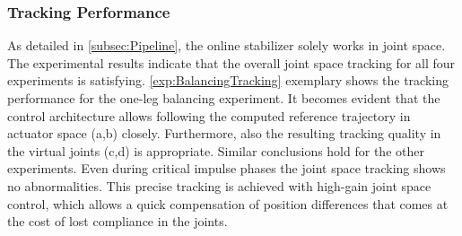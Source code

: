 \subsubsection{Tracking Performance}
As detailed in \cref{subsec:Pipeline}, the online stabilizer solely works in joint space. The experimental results indicate that the overall joint space tracking for all four experiments is satisfying. 
\cref{exp:BalancingTracking} exemplary shows the tracking performance for the one-leg balancing experiment. It becomes evident that the control architecture allows following the computed reference trajectory in actuator space (a,b) closely. Furthermore, also the resulting tracking quality in the virtual joints (c,d) is appropriate. Similar conclusions hold for the other experiments. Even during critical impulse phases the joint space tracking shows no abnormalities. This precise tracking is achieved with high-gain joint space control, which allows a quick compensation of position differences that comes at the cost of lost compliance in the joints.
